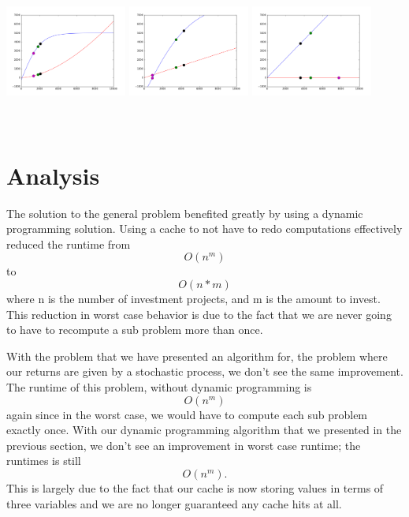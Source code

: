 \documentclass{article}
\begin{document}
\includegraphics[width=4cm, height=5cm]{data_1}
\includegraphics[width=4cm, height=5cm]{data_2}
\includegraphics[width=4cm, height=5cm]{data_3}


\newline
\pagebreak
\section{Analysis}
\par The solution to the general problem benefited greatly by using a dynamic programming solution.  Using a cache to not have to redo computations effectively reduced the runtime from $$O(n^{m})$$ to $$O(n*m)$$ where n is the number of investment projects, and m is the amount to invest.  This reduction in worst case behavior is due to the fact that we are never going to have to recompute a sub problem more than once.  
\newline
\par With the problem that we have presented an algorithm for, the problem where our returns are given by a stochastic process, we don't see the same improvement.  The runtime of this problem, without dynamic programming is $$O(n^{m})$$ again since in the worst case, we would have to compute each sub problem exactly once. With our dynamic programming algorithm that we presented in the previous section, we don't see an improvement in worst case runtime; the runtimes is still $$O(n^{m}).$$ This is largely due to the fact that our cache is now storing values in terms of three variables and we are no longer guaranteed any cache hits at all. 
\end{document}
